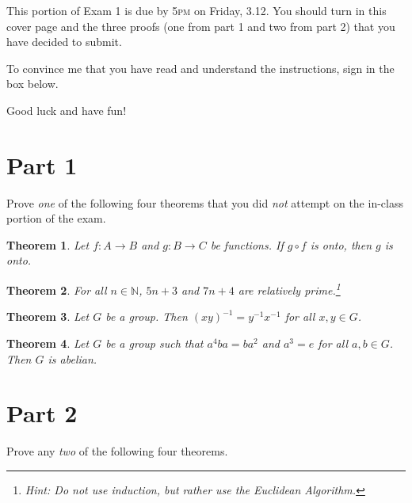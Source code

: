 \documentclass[11pt]{article}
\newtheorem{theorem}{Theorem}
\theoremstyle{definition}
\begin{document}
This portion of Exam 1 is due by 5\textsc{pm} on Friday, 3.12.  You should turn in this cover page and the three proofs (one from part 1 and two from part 2) that you have decided to submit.

\bigskip

To convince me that you have read and understand the instructions, sign in the box below.

\bigskip


\bigskip

Good luck and have fun!

\newpage

\section*{Part 1}
Prove \emph{one} of the following four theorems that you did \emph{not} attempt on the in-class portion of the exam.

\bigskip

\begin{theorem}
Let $f: A\to B$ and $g: B \to C$ be functions.  If $g\circ f$ is onto, then $g$ is onto.
\end{theorem}

\newpage

\begin{theorem}
For all $n\in \mathbb{N}$, $5n+3$ and $7n+4$ are relatively prime.\footnote{Hint: Do not use induction, but rather use the Euclidean Algorithm.}
\end{theorem}

\newpage

\begin{theorem}
Let $G$ be a group.  Then $(xy)^{-1}=y^{-1}x^{-1}$ for all $x,y\in G$.
\end{theorem}

\newpage

\begin{theorem}
Let $G$ be a group such that $a^4 ba=ba^2$ and $a^3=e$ for all $a,b\in G$.  Then $G$ is abelian.
\end{theorem}

\newpage

\section*{Part 2}
Prove any \emph{two} of the following four theorems.
\end{document}

